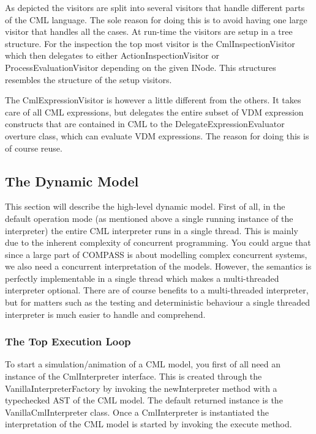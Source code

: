 \documentclass[a4paper, 10pt]{include/compassreport}   %
\begin{document}
As depicted the visitors are split into several visitors that handle
different parts of the CML language. The sole reason for doing this is
to avoid having one large visitor that handles all the cases. At
run-time the visitors are setup in a tree structure. For the
inspection the top most visitor is the CmlInspectionVisitor which then
delegates to either ActionInspectionVisitor or
ProcessEvaluationVisitor depending on the given INode. This structures
resembles the structure of the setup visitors.

The CmlExpressionVisitor is however a little different from the
others. It takes care of all CML expressions, but delegates the entire
subset of VDM expression constructs that are contained in CML to the
DelegateExpressionEvaluator overture class, which can evaluate VDM
expressions. The reason for doing this is of course reuse.

\subsection{The Dynamic Model}
\label{sec:dynamic_structure}
This section will describe the high-level dynamic model. First of
all, in the default operation mode (as mentioned above a single
running instance of the interpreter) the entire CML interpreter runs
in a single thread. This is mainly due to the inherent complexity of
concurrent programming. You could argue that since a large part of
COMPASS is about modelling complex concurrent systems, we also need a
concurrent interpretation of the models. However, the semantics is
perfectly implementable in a single thread which makes a
multi-threaded interpreter optional. There are of course benefits to a
multi-threaded interpreter, but for matters such as the testing and
deterministic behaviour a single threaded interpreter is much easier
to handle and comprehend.

\subsubsection*{The Top Execution Loop}

To start a simulation/animation of a CML model, you first of all need
an instance of the CmlInterpreter interface. This is created
through the VanillaInterpreterFactory by invoking the
newInterpreter method with a typechecked AST of the CML
model. The default returned instance is the
VanillaCmlInterpreter class. Once a CmlInterpreter
is instantiated the interpretation of the CML model is started by
invoking the execute method.
\end{document}
